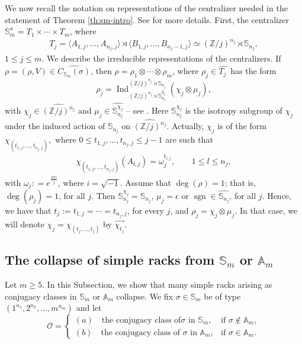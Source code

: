 \documentclass[11pt]{amsart} \textheight 22cm
\newcommand{\Ind}{\operatorname{Ind}}
\renewcommand{\^}[1]{\mbox{$^{\left( #1 \right)}$}}
\renewcommand{\_}[1]{\mbox{$_{\left( #1 \right)}$}}
\newcommand{\Z}{{\mathbb Z}}
\newcommand{\Oc}{{\mathcal O}}
\newcommand\sgn{\operatorname{sgn}}
\theoremstyle{plain}
\theoremstyle{definition}
\theoremstyle{remark}
\newcommand\am{\mathbb A_m}
\newcommand\sm{\mathbb S_m}
\newcommand\s{\mathbb S}
\theoremstyle{remark}
\begin{document}
We now recall the notation on representations of the centralizer
needed in the statement of Theorem \ref{th:sm-intro}. See
\cite{afz} for more details. First, the centralizer $\sm^\sigma =
T_1 \times \cdots \times T_m$, where
\begin{align}\label{genofcent}
   T_j =\langle A_{1,j}, \dots ,A_{n_j,j} \rangle \rtimes \langle
   B_{1,j}, \dots , B_{n_j-1,j} \rangle \simeq  (\Z/ j)^{n_j} \rtimes
   \s_{n_j},
\end{align}
$1\leq j \leq m$.  We describe the irreducible representations of
the centralizers. If $\rho=(\rho,V) \in
\widehat{C_{\s_m}(\sigma)}$, then $\rho=\rho_1\otimes \cdots
\otimes \rho_m$, where $\rho_j \in \widehat{T_{j}{\,}}$ has the
form
\begin{equation}\label{formrho2}
   \rho_j=\Ind_{(\Z/{j})^{n_j} \rtimes \mathbb
   S_{n_j}^{\chi_j}}^{(\Z/{j})^{n_j} \rtimes \mathbb S_{n_j}} (\chi_j
   \otimes \mu_j),
\end{equation} with
$\chi_j \in \widehat{(\Z/{j})^{n_j}}$ and $\mu_j \in
\widehat{\s_{n_j}^{\chi_j}}$ -- see \cite[Sect. 8.6]{S}. Here
$\s_{n_j}^{\chi_j}$ is the isotropy subgroup of $\chi_j$ under the
induced action of $\s_{n_j}$ on $\widehat{(\Z/{j})^{n_j}}$.
Actually, $\chi_j$ is of the form
$\chi_{(t_{1,j},\dots,t_{n_j,j})},$ where $0\leq
t_{1,j},\dots,t_{n_j,j}  \leq j-1$ are such that
\begin{align}\label{lost}
   \chi_{(t_{1,j},\dots,t_{n_j,j})}(A_{l,j})=\omega_j^{t_{l,j}},\qquad
   1\leq l \leq n_j,
\end{align}
with $\omega_j : = e ^ {\frac {2\pi i} {j}}$, where $i=
\sqrt{-1}$. Assume that $\deg(\rho)=1$; that is, $\deg(\rho_j)=1$,
for all $j$. Then $\mathbb S_{n_j}^{\chi_j}=\mathbb S_{n_j}$,
$\mu_j=\epsilon$  or $\sgn \in \widehat{\mathbb S_{n_j}}$,  for
all $j$. Hence, we have that $t_{j}:=t_{1,j}=\cdots=t_{n_j,j}$,
for every $j$, and $\rho_j= \chi_j \otimes \mu_j$. In that case,
we will denote $\chi_j=\chi_{(t_j,\dots,t_j)}$ by
$\overrightarrow{\chi_{t_j}}$.


\medbreak\subsection{The collapse of simple racks from $\sm$ or
$\am$}\label{subsection:racks-caen}

Let $m\ge 5$.  In this Subsection, we show that many simple racks
arising as conjugacy classes in $\sm$ or $\am$ collapse. We fix
$\sigma\in \mathbb S_m$ be of type $(1^{n_1}, 2^{n_2}, \dots,
m^{n_m})$ and let
$$\Oc = \begin{cases} (a) \quad \text{the conjugacy class of
$\sigma$ in $\sm$}, &\text{if } \sigma\notin \am,\\ (b) \quad
\text{the conjugacy class of  $\sigma$ in $\am$}, &\text{if }
\sigma\in \am.
\end{cases}$$
\end{document}
